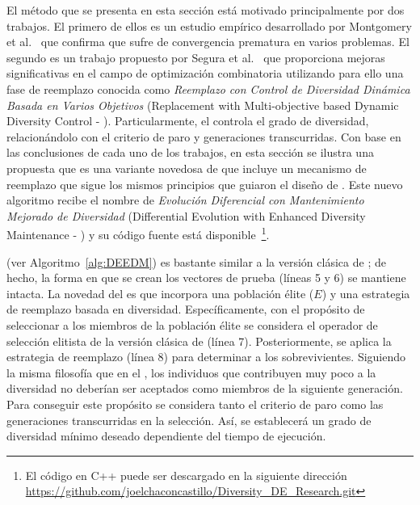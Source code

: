 El método que se presenta en esta sección está motivado principalmente por dos trabajos.
%
El primero de ellos es un estudio empírico desarrollado por Montgomery et al.~\cite{montgomery2012simple} que confirma que 
\DE{} sufre de convergencia prematura en varios problemas.
%
El segundo es un trabajo propuesto por Segura et al.~\cite{segura2016novel} que proporciona mejoras significativas en el campo de optimización combinatoria
utilizando para ello una fase de reemplazo conocida como \textit{Reemplazo con Control de Diversidad Dinámica Basada en Varios Objetivos} 
(Replacement with Multi-objective based Dynamic Diversity Control - \RMDDC{}).
%
Particularmente, el \RMDDC{} controla el grado de diversidad, relacionándolo con el criterio de paro y generaciones transcurridas.
%
Con base en las conclusiones de cada uno de los trabajos, en esta sección se ilustra una propuesta que es una variante novedosa de \DE{} que
incluye un mecanismo de reemplazo que sigue los mismos principios que guiaron el diseño de \RMDDC{}.
%
Este nuevo algoritmo recibe el nombre de \textit{Evolución Diferencial con Mantenimiento Mejorado de Diversidad} 
(Differential Evolution with Enhanced Diversity Maintenance - \DEEDM{}) y su código fuente está disponible~\footnote{El código en C++ puede ser descargado en la siguiente dirección \url{https://github.com/joelchaconcastillo/Diversity\_DE\_Research.git}}.

\DEEDM{} (ver Algoritmo~\ref{alg:DEEDM}) es bastante similar a la versión clásica de \DE{}; de hecho, 
la forma en que se crean los vectores de prueba (líneas 5 y 6) se mantiene intacta.
%
La novedad del \DEEDM{} es que incorpora una población élite ($E$) y una estrategia de reemplazo basada en diversidad.
%
Específicamente, con el propósito de seleccionar a los miembros de la población élite se considera el operador de selección elitista de la versión clásica
de \DE{} (línea 7).
%
Posteriormente, se aplica la estrategia de reemplazo (línea 8) para determinar a los sobrevivientes.
%
Siguiendo la misma filosofía que en el \RMDDC{}, los individuos que contribuyen muy poco a la diversidad no deberían ser aceptados como miembros 
de la siguiente generación.
%
Para conseguir este propósito se considera tanto el criterio de paro como las generaciones transcurridas en la selección.
%
Así, se establecerá un grado de diversidad mínimo deseado dependiente del tiempo de ejecución.

